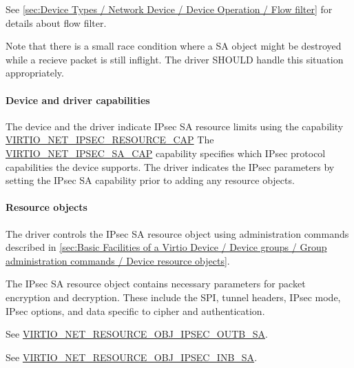 See \ref{sec:Device Types / Network Device / Device Operation / Flow filter}
for details about flow filter.

Note that there is a small race condition where a SA object might be destroyed
while a recieve packet is still inflight. The driver SHOULD handle this situation
appropriately.

\paragraph{Device and driver capabilities}
\label{par:Device Types / Network Device / Device Operation / IPsec Operation / Device and driver capabilities}

The device and the driver indicate IPsec SA resource limits using the capability
\hyperref[par:Device Types / Crypto Device / Device Operation / IPsec Service Operation / Device and driver capabilities / VIRTIO-CRYPTO-IPSEC-RESOURCE-CAP]{VIRTIO_NET_IPSEC_RESOURCE_CAP}
The \hyperref[par:Device Types / Crypto Device / Device Operation / IPsec Service Operation / Device and driver capabilities / VIRTIO-CRYPTO-IPSEC-SA-CAP]{VIRTIO_NET_IPSEC_SA_CAP}
capability specifies which IPsec protocol capabilities the device supports. The driver indicates
the IPsec parameters by setting the IPsec SA capability prior to adding any resource objects.

\paragraph{Resource objects}
\label{par:Device Types / Network Device / Device Operation / IPsec Operation / Resource objects}

The driver controls the IPsec SA resource object using administration commands described in
\ref{sec:Basic Facilities of a Virtio Device / Device groups / Group administration commands / Device resource objects}.

The IPsec SA resource object contains necessary parameters for packet
encryption and decryption. These include the SPI, tunnel headers, IPsec mode,
IPsec options, and data specific to cipher and authentication.

See \hyperref[par:Device Types / Crypto Device / Device Operation / IPsec Service Operation / Resource objects / VIRTIO-CRYPTO-RESOURCE-OBJ-IPSEC-OUTBOUND-SA]{VIRTIO_NET_RESOURCE_OBJ_IPSEC_OUTB_SA}.

See \hyperref[par:Device Types / Crypto Device / Device Operation / IPsec Service Operation / Resource objects / VIRTIO-CRYPTO-RESOURCE-OBJ-IPSEC-INBOUND-SA]{VIRTIO_NET_RESOURCE_OBJ_IPSEC_INB_SA}.

